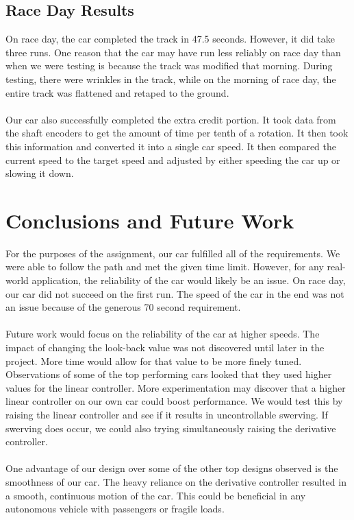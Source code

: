 \documentclass[12pt]{article}
\begin{document}
\subsection{Race Day Results}
On race day, the car completed the track in 47.5 seconds. However, it did take three runs. One reason that the car may have run less reliably on race day than when we were testing is because the track was modified that morning. During testing, there were wrinkles in the track, while on the morning of race day, the entire track was flattened and retaped to the ground.
\\ \\ 
Our car also successfully completed the extra credit portion. It took data from the shaft encoders to get the amount of time per tenth of a rotation. It then took this information and converted it into a single car speed. It then compared the current speed to the target speed and adjusted by either speeding the car up or slowing it down.

\section{Conclusions and Future Work}
For the purposes of the assignment, our car fulfilled all of the requirements. We were able to follow the path and met the given time limit. However, for any real-world application, the reliability of the car would likely be an issue. On race day, our car did not succeed on the first run. The speed of the car in the end was not an issue because of the generous 70 second requirement.
\\ \\ 
Future work would focus on the reliability of the car at higher speeds. The impact of changing the look-back value was not discovered until later in the project. More time would allow for that value to be more finely tuned. Observations of some of the top performing cars looked that they used higher values for the linear controller. More experimentation may discover that a higher linear controller on our own car could boost performance. We would test this by raising the linear controller and see if it results in uncontrollable swerving. If swerving does occur, we could also trying simultaneously raising the derivative controller.
\\ \\ 
One advantage of our design over some of the other top designs observed is the smoothness of our car. The heavy reliance on the derivative controller resulted in a smooth, continuous motion of the car. This could be beneficial in any autonomous vehicle with passengers or fragile loads.

\printbibliography
\end{document}
